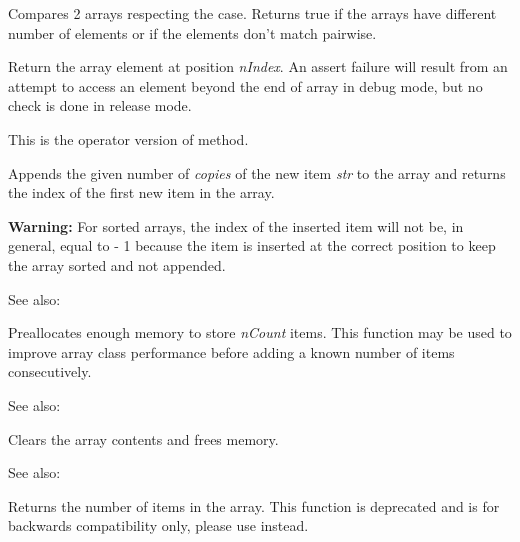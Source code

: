Compares 2 arrays respecting the case. Returns true if the arrays have
different number of elements or if the elements don't match pairwise.

\label{wxarraystringoperatorindex}


Return the array element at position {\it nIndex}. An assert failure will
result from an attempt to access an element beyond the end of array in debug
mode, but no check is done in release mode.

This is the operator version of  method.

\label{wxarraystringadd}


Appends the given number of {\it copies} of the new item {\it str} to the
array and returns the index of the first new item in the array.

{\bf Warning:} For sorted arrays, the index of the inserted item will not be,
in general, equal to  - 1 because
the item is inserted at the correct position to keep the array sorted and not
appended.

See also: 

\label{wxarraystringalloc}


Preallocates enough memory to store {\it nCount} items. This function may be
used to improve array class performance before adding a known number of items
consecutively.

See also: 

\label{wxarraystringclear}


Clears the array contents and frees memory.

See also: 

\label{wxarraystringcount}


Returns the number of items in the array. This function is deprecated and is
for backwards compatibility only, please use 
 instead.

